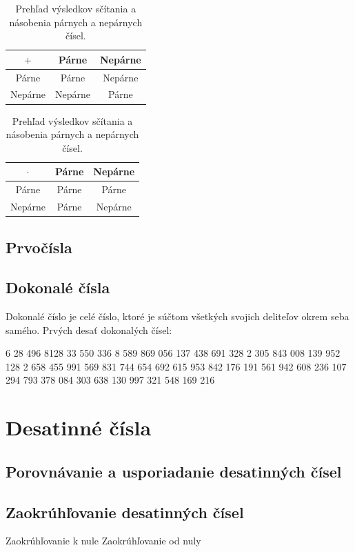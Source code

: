 \documentclass{report}
\begin{document}
\begin{table}[H]
  \centering
  \renewcommand{\arraystretch}{1.5}
  \begin{tabular}{c|cc}
    \(+\) & Párne & Nepárne\\
    \hline
    Párne & Párne & Nepárne \\
    Nepárne & Nepárne & Párne \\
  \end{tabular}
  \hspace{1em}
  \begin{tabular}{c|cc}
    \(\cdot\) & Párne & Nepárne\\
    \hline
    Párne & Párne & Párne \\
    Nepárne & Párne & Nepárne \\
  \end{tabular}
  \caption{Prehľad výsledkov sčítania a násobenia párnych a nepárnych čísel.}
\end{table}

\section{Prvočísla}

\section{Dokonalé čísla}

Dokonalé číslo je celé číslo, ktoré je súčtom všetkých svojich deliteľov okrem seba samého.
Prvých desať dokonalých čísel:

6
28
496
8128
33 550 336
8 589 869 056
137 438 691 328
2 305 843 008 139 952 128
2 658 455 991 569 831 744 654 692 615 953 842 176
191 561 942 608 236 107 294 793 378 084 303 638 130 997 321 548 169 216

\chapter{Desatinné čísla}

\section{Porovnávanie a usporiadanie desatinných čísel}

\section{Zaokrúhľovanie desatinných čísel}

Zaokrúhľovanie k nule
Zaokrúhľovanie od nuly
\end{document}
